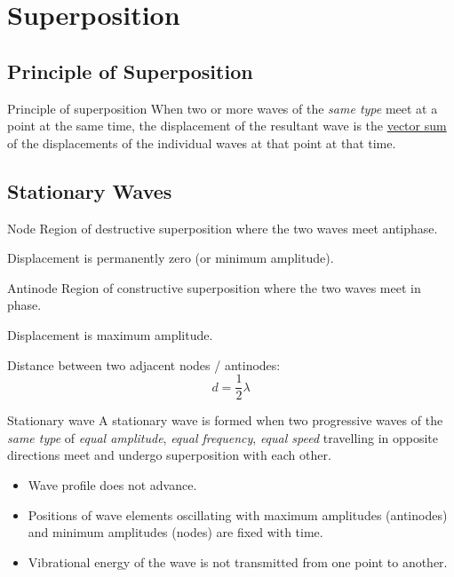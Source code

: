 \section{Superposition}
\subsection{Principle of Superposition}
\begin{defn}{Principle of superposition}{}
When two or more waves of the \emph{same type} meet at a point at the same time, the displacement of the resultant wave is the \underline{vector sum} of the displacements of the individual waves at that point at that time.
\end{defn}

\subsection{Stationary Waves}
\begin{defn}{Node}{}
Region of destructive superposition where the two waves meet antiphase.

Displacement is permanently zero (or minimum amplitude).
\end{defn}

\begin{defn}{Antinode}{}
Region of constructive superposition where the two waves meet in phase. 

Displacement is maximum amplitude.
\end{defn}

Distance between two adjacent nodes / antinodes:
\[ d=\frac{1}{2}\lambda \]

\begin{defn}{Stationary wave}{}
A stationary wave is formed when two progressive waves of the \emph{same type} of \emph{equal amplitude}, \emph{equal frequency}, \emph{equal speed} travelling in opposite directions meet and undergo superposition with each other.
\end{defn}

\begin{itemize}
\item Wave profile does not advance.
\item Positions of wave elements oscillating with maximum amplitudes (antinodes) and minimum amplitudes (nodes) are fixed with time. 
\item Vibrational energy of the wave is not transmitted from one point to another.
\end{itemize}

